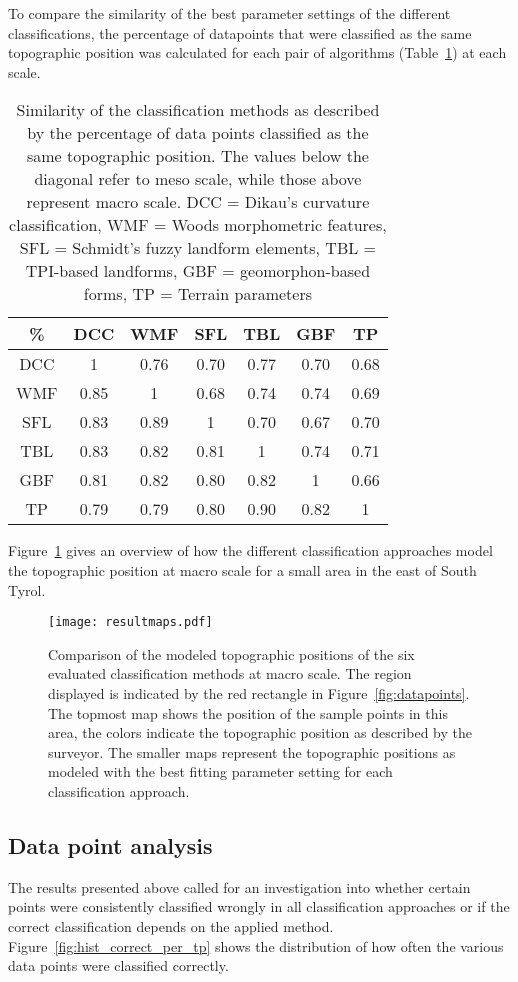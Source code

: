 \documentclass[preprint,12pt,authoryear]{elsarticle}
\begin{document}
To compare the similarity of the best parameter settings of the different classifications, the percentage of datapoints that were classified as the same topographic position was calculated for each pair of algorithms (Table~\ref{table:similarity_matrix}) at each scale. 
\begin{table}[ht]
\caption{Similarity of the classification methods as described by the percentage of data points classified as the same topographic position. The values below the diagonal refer to meso scale, while those above represent macro scale. DCC = Dikau's curvature classification, WMF = Woods morphometric features, SFL = Schmidt's fuzzy landform elements, TBL = TPI-based landforms, GBF = geomorphon-based forms, TP = Terrain parameters}
\centering
\begin{tabular}{ccccccc}
  \hline
\%  & DCC & WMF &SFL &TBL & GBF & TP \\ 
  \hline
DCC &1 & 0.76 & 0.70 & 0.77 & 0.70 & 0.68 \\ 
WMF &0.85  & 1 & 0.68 & 0.74 & 0.74 & 0.69 \\ 
SFL & 0.83 & 0.89 & 1 & 0.70 & 0.67 & 0.70 \\ 
TBL & 0.83 &0.82  &0.81  & 1 & 0.74 & 0.71 \\ 
GBF &0.81  &0.82  & 0.80  & 0.82 & 1 & 0.66 \\ 
TP &0.79  &0.79  &0.80  &0.90  &0.82  & 1 \\ 
   \hline
\end{tabular}
\label{table:similarity_matrix}
\end{table}
Figure~\ref{fig:resultmaps} gives an overview of how the different classification approaches model the topographic position at macro scale for a small area in the east of South Tyrol.
\begin{figure}
\texttt{[image: resultmaps.pdf]}
\caption{Comparison of the modeled topographic positions of the six evaluated classification methods at macro scale. The region displayed is indicated by the red rectangle in Figure~\ref{fig:datapoints}. The topmost map shows the position of the sample points in this area, the colors indicate the topographic position as described by the surveyor. The smaller maps represent the topographic positions as modeled with the best fitting parameter setting for each classification approach.}
\label{fig:resultmaps}
\end{figure}

\subsection{Data point analysis} 
The results presented above called for an investigation into whether certain points were consistently classified wrongly in all classification approaches or if the correct classification depends on the applied method. Figure~\ref{fig:hist_correct_per_tp} shows the distribution of how often the various data points were classified correctly.
\end{document}
